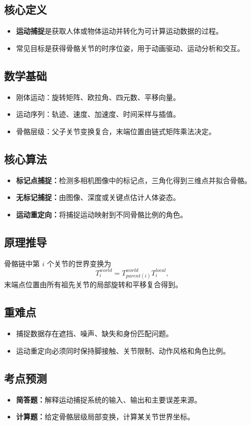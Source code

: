 \documentclass[UTF8,fontset=fandol,11pt]{ctexart}
\newcommand{\key}[1]{\textbf{#1}}
\newcommand{\exam}[1]{\textcolor{blue!55!black}{\textbf{#1}}}
\begin{document}
\subsection{核心定义}
\begin{itemize}
  \item \key{运动捕捉}是获取人体或物体运动并转化为可计算运动数据的过程。
  \item 常见目标是获得骨骼关节的时序位姿，用于动画驱动、运动分析和交互。
\end{itemize}
\subsection{数学基础}
\begin{itemize}
  \item 刚体运动：旋转矩阵、欧拉角、四元数、平移向量。
  \item 运动序列：轨迹、速度、加速度、时间采样与插值。
  \item 骨骼层级：父子关节变换复合，末端位置由链式矩阵乘法决定。
\end{itemize}
\subsection{核心算法}
\begin{itemize}
  \item \key{标记点捕捉：}检测多相机图像中的标记点，三角化得到三维点并拟合骨骼。
  \item \key{无标记捕捉：}由图像、深度或关键点估计人体姿态。
  \item \key{运动重定向：}将捕捉运动映射到不同骨骼比例的角色。
\end{itemize}
\subsection{原理推导}
骨骼链中第 $i$ 个关节的世界变换为
\[
  T_i^{world}=T_{parent(i)}^{world}T_i^{local},
\]
末端点位置由所有祖先关节的局部旋转和平移复合得到。
\subsection{重难点}
\begin{itemize}
  \item 捕捉数据存在遮挡、噪声、缺失和身份匹配问题。
  \item 运动重定向必须同时保持脚接触、关节限制、动作风格和角色比例。
\end{itemize}
\subsection{考点预测}
\begin{itemize}
  \item \exam{简答题：}解释运动捕捉系统的输入、输出和主要误差来源。
  \item \exam{计算题：}给定骨骼层级局部变换，计算某关节世界坐标。
\end{itemize}
\end{document}
